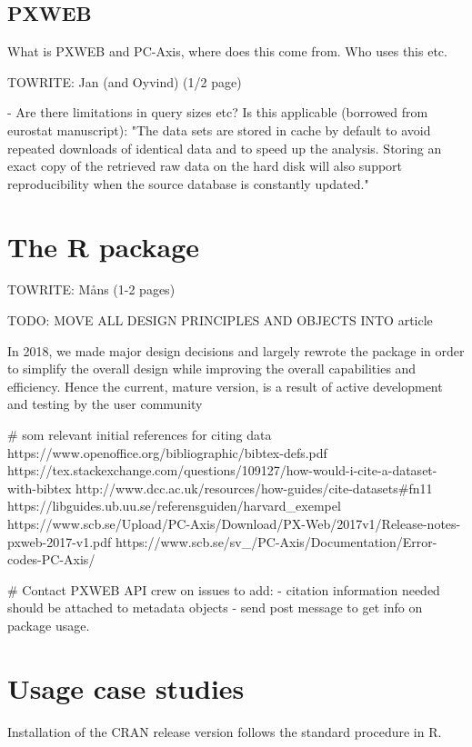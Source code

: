 \documentclass[article]{jss}
\begin{document}
\subsection[PXWEB and PC-Axis]{PXWEB}

What is PXWEB and PC-Axis, where does this come from. Who uses this etc.

TOWRITE: Jan (and Oyvind) (1/2 page)

- Are there limitations in query sizes etc? Is this applicable (borrowed from eurostat manuscript): "The data sets are stored in cache by default to avoid repeated downloads of identical data and to speed up the analysis. Storing an exact copy of the retrieved raw data on the hard disk will also support reproducibility when the source database is constantly updated."


\section[pxweb]{The  R package}

TOWRITE: Måns (1-2 pages)

TODO: MOVE ALL DESIGN PRINCIPLES AND OBJECTS INTO article

In 2018, we made major design decisions and largely rewrote the package in order to simplify the overall design while improving the overall capabilities and efficiency. Hence the current, mature version, is a result of active development and testing by the user community 


# som relevant initial references for citing data
https://www.openoffice.org/bibliographic/bibtex-defs.pdf
https://tex.stackexchange.com/questions/109127/how-would-i-cite-a-dataset-with-bibtex
http://www.dcc.ac.uk/resources/how-guides/cite-datasets#fn11
https://libguides.ub.uu.se/referensguiden/harvard\_exempel
https://www.scb.se/Upload/PC-Axis/Download/PX-Web/2017v1/Release-notes-pxweb-2017-v1.pdf
https://www.scb.se/sv\_/PC-Axis/Documentation/Error-codes-PC-Axis/

# Contact PXWEB API crew on issues to add:
- citation information needed should be attached to metadata objects
- send post message to get info on package usage.


\section[case studies]{Usage case studies}

Installation of the CRAN release version follows the standard procedure in R.
\end{document}
